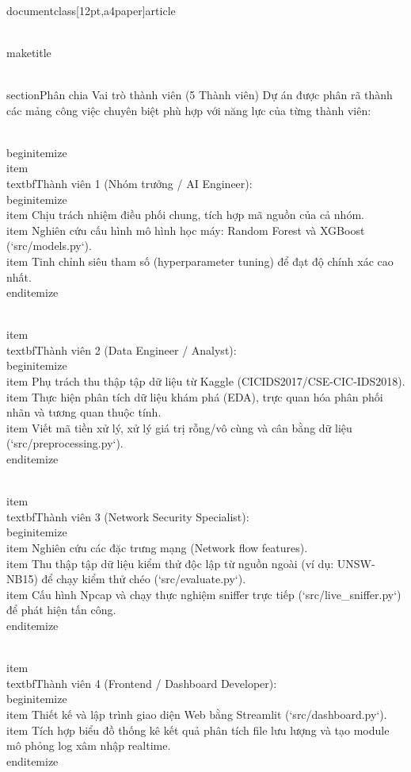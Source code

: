 \\documentclass[12pt,a4paper]{article}
\begin{document}
\\maketitle

\\section{Phân chia Vai trò thành viên (5 Thành viên)}
Dự án được phân rã thành các mảng công việc chuyên biệt phù hợp với năng lực của từng thành viên:

\\begin{itemize}
    \\item \\textbf{Thành viên 1 (Nhóm trưởng / AI Engineer):}
    \\begin{itemize}
        \\item Chịu trách nhiệm điều phối chung, tích hợp mã nguồn của cả nhóm.
        \\item Nghiên cứu cấu hình mô hình học máy: Random Forest và XGBoost (`src/models.py`).
        \\item Tinh chỉnh siêu tham số (hyperparameter tuning) để đạt độ chính xác cao nhất.
    \\end{itemize}
    
    \\item \\textbf{Thành viên 2 (Data Engineer / Analyst):}
    \\begin{itemize}
        \\item Phụ trách thu thập tập dữ liệu từ Kaggle (CICIDS2017/CSE-CIC-IDS2018).
        \\item Thực hiện phân tích dữ liệu khám phá (EDA), trực quan hóa phân phối nhãn và tương quan thuộc tính.
        \\item Viết mã tiền xử lý, xử lý giá trị rỗng/vô cùng và cân bằng dữ liệu (`src/preprocessing.py`).
    \\end{itemize}
    
    \\item \\textbf{Thành viên 3 (Network Security Specialist):}
    \\begin{itemize}
        \\item Nghiên cứu các đặc trưng mạng (Network flow features).
        \\item Thu thập tập dữ liệu kiểm thử độc lập từ nguồn ngoài (ví dụ: UNSW-NB15) để chạy kiểm thử chéo (`src/evaluate.py`).
        \\item Cấu hình Npcap và chạy thực nghiệm sniffer trực tiếp (`src/live_sniffer.py`) để phát hiện tấn công.
    \\end{itemize}
    
    \\item \\textbf{Thành viên 4 (Frontend / Dashboard Developer):}
    \\begin{itemize}
        \\item Thiết kế và lập trình giao diện Web bằng Streamlit (`src/dashboard.py`).
        \\item Tích hợp biểu đồ thống kê kết quả phân tích file lưu lượng và tạo module mô phỏng log xâm nhập realtime.
    \\end{itemize}
    
\end{document}
